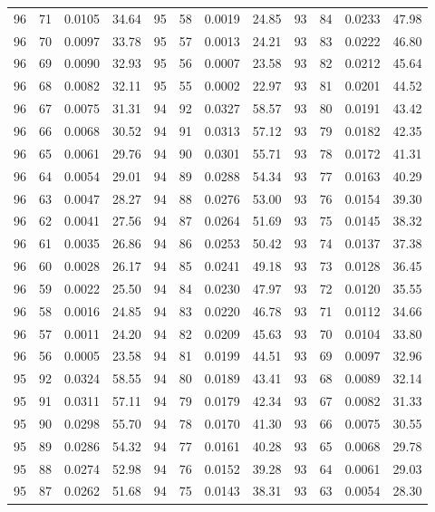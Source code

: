 \begin{tabular}{llll|llll|llll}
96 & 71 & 0.0105 & 34.64 & 95 & 58 & 0.0019 & 24.85 & 93 & 84 & 0.0233 & 47.98\\
96 & 70 & 0.0097 & 33.78 & 95 & 57 & 0.0013 & 24.21 & 93 & 83 & 0.0222 & 46.80\\
96 & 69 & 0.0090 & 32.93 & 95 & 56 & 0.0007 & 23.58 & 93 & 82 & 0.0212 & 45.64\\
96 & 68 & 0.0082 & 32.11 & 95 & 55 & 0.0002 & 22.97 & 93 & 81 & 0.0201 & 44.52\\
96 & 67 & 0.0075 & 31.31 & 94 & 92 & 0.0327 & 58.57 & 93 & 80 & 0.0191 & 43.42\\
96 & 66 & 0.0068 & 30.52 & 94 & 91 & 0.0313 & 57.12 & 93 & 79 & 0.0182 & 42.35\\
96 & 65 & 0.0061 & 29.76 & 94 & 90 & 0.0301 & 55.71 & 93 & 78 & 0.0172 & 41.31\\
96 & 64 & 0.0054 & 29.01 & 94 & 89 & 0.0288 & 54.34 & 93 & 77 & 0.0163 & 40.29\\
96 & 63 & 0.0047 & 28.27 & 94 & 88 & 0.0276 & 53.00 & 93 & 76 & 0.0154 & 39.30\\
96 & 62 & 0.0041 & 27.56 & 94 & 87 & 0.0264 & 51.69 & 93 & 75 & 0.0145 & 38.32\\
96 & 61 & 0.0035 & 26.86 & 94 & 86 & 0.0253 & 50.42 & 93 & 74 & 0.0137 & 37.38\\
96 & 60 & 0.0028 & 26.17 & 94 & 85 & 0.0241 & 49.18 & 93 & 73 & 0.0128 & 36.45\\
96 & 59 & 0.0022 & 25.50 & 94 & 84 & 0.0230 & 47.97 & 93 & 72 & 0.0120 & 35.55\\
96 & 58 & 0.0016 & 24.85 & 94 & 83 & 0.0220 & 46.78 & 93 & 71 & 0.0112 & 34.66\\
96 & 57 & 0.0011 & 24.20 & 94 & 82 & 0.0209 & 45.63 & 93 & 70 & 0.0104 & 33.80\\
96 & 56 & 0.0005 & 23.58 & 94 & 81 & 0.0199 & 44.51 & 93 & 69 & 0.0097 & 32.96\\
95 & 92 & 0.0324 & 58.55 & 94 & 80 & 0.0189 & 43.41 & 93 & 68 & 0.0089 & 32.14\\
95 & 91 & 0.0311 & 57.11 & 94 & 79 & 0.0179 & 42.34 & 93 & 67 & 0.0082 & 31.33\\
95 & 90 & 0.0298 & 55.70 & 94 & 78 & 0.0170 & 41.30 & 93 & 66 & 0.0075 & 30.55\\
95 & 89 & 0.0286 & 54.32 & 94 & 77 & 0.0161 & 40.28 & 93 & 65 & 0.0068 & 29.78\\
95 & 88 & 0.0274 & 52.98 & 94 & 76 & 0.0152 & 39.28 & 93 & 64 & 0.0061 & 29.03\\
95 & 87 & 0.0262 & 51.68 & 94 & 75 & 0.0143 & 38.31 & 93 & 63 & 0.0054 & 28.30\\

\end{tabular}
